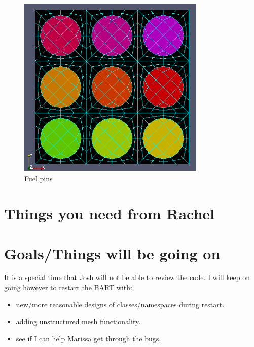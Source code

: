 \documentclass{article}
\begin{document}
\begin{figure}
	\centering
	\includegraphics[width=0.8\textwidth]{rods}
	\caption{Fuel pins}
\end{figure}
\section{Things you need from Rachel}


\section{Goals/Things will be going on}
It is a special time that Josh will not be able to review the code. I will keep on going however
to restart the BART with:
\begin{itemize}
	\item new/more reasonable designs of classes/namespaces during restart.
	\item adding unstructured mesh functionality.
	\item see if I can help Marissa get through the bugs.
\end{itemize}

\end{document}
